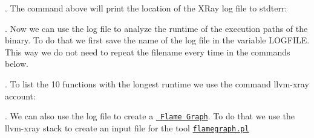 \begin{DoxyCode}{0}
\end{DoxyCode}


. The command above will print the location of the X\+Ray log file to {\ttfamily stdterr}\+:


\begin{DoxyCode}{0}
\end{DoxyCode}


. Now we can use the log file to analyze the runtime of the execution paths of the binary. To do that we first save the name of the log file in the variable {\ttfamily L\+O\+G\+F\+I\+LE}. This way we do not need to repeat the filename every time in the commands below.


\begin{DoxyCode}{0}
\end{DoxyCode}


. To list the 10 functions with the longest runtime we use the command {\ttfamily llvm-\/xray account}\+:


\begin{DoxyCode}{0}
\end{DoxyCode}


. We can also use the log file to create a \href{http://www.brendangregg.com/flamegraphs.html}{\texttt{ Flame Graph}}. To do that we use the {\ttfamily llvm-\/xray stack} to create an input file for the tool \href{https://github.com/brendangregg/FlameGraph}{\texttt{ {\ttfamily flamegraph.\+pl}}}


